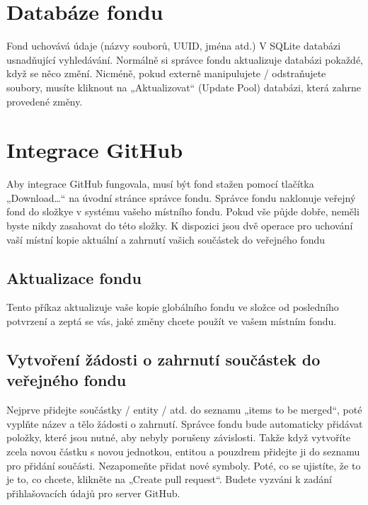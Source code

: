 \documentclass[letterpaper,10pt,czech]{sphinxmanual}
\begin{document}
\section{Databáze fondu}
\label{\detokenize{pool-mgr_cz:databaze-fondu}}
Fond uchovává údaje (názvy souborů, UUID, jména atd.) V SQLite
databázi usnadňující vyhledávání. Normálně si správce fondu aktualizuje
databázi pokaždé, když se něco změní. Nicméně, pokud
externě manipulujete / odstraňujete soubory, musíte kliknout na „Aktualizovat“ (Update
Pool) databázi, která zahrne provedené změny.


\section{Integrace GitHub}
\label{\detokenize{pool-mgr_cz:integrace-github}}
Aby integrace GitHub fungovala, musí být fond stažen pomocí
tlačítka „Download…“ na úvodní stránce správce fondu. Správce fondu naklonuje veřejný fond do složkye  v systému vašeho místního fondu. Pokud vše půjde dobře, neměli byste nikdy zasahovat do této složky. K dispozici jsou dvě operace pro uchování vaší místní kopie
aktuální a zahrnutí vašich součástek do veřejného fondu


\subsection{Aktualizace fondu}
\label{\detokenize{pool-mgr_cz:aktualizace-fondu}}
Tento příkaz aktualizuje vaše kopie globálního fondu ve složce 
od posledního potvrzení a zeptá se vás, jaké změny chcete
použít ve vašem místním fondu.


\subsection{Vytvoření žádosti o zahrnutí součástek do veřejného fondu}
\label{\detokenize{pool-mgr_cz:vytvoreni-zadosti-o-zahrnuti-soucastek-do-verejneho-fondu}}
Nejprve přidejte součástky / entity / atd. do seznamu „items to be merged“,
poté vyplňte název a tělo žádosti o zahrnutí. Správce fondu bude
automaticky přidávat položky, které jsou nutné, aby nebyly porušeny závislosti. Takže když
vytvoříte zcela novou částku s novou jednotkou, entitou a pouzdrem
přidejte ji do seznamu pro přidání součásti. Nezapomeňte přidat nové
symboly. Poté, co se ujistíte, že to je to, co chcete, klikněte na „Create
pull request“. Budete vyzváni k zadání přihlašovacích údajů pro server GitHub.
\end{document}
